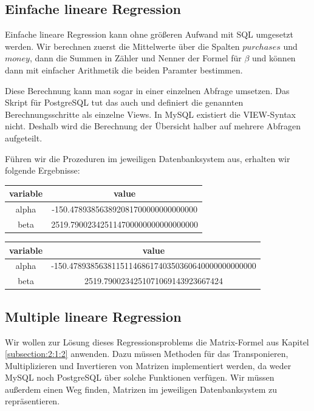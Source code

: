 \subsection{Einfache lineare Regression}
\label{subsection:3:4:1}

Einfache lineare Regression kann ohne größeren Aufwand mit SQL umgesetzt werden. Wir berechnen zuerst die Mittelwerte über die Spalten $purchases$ und $money$, dann die Summen in Zähler und Nenner der Formel für $\beta$ und können dann mit einfacher Arithmetik die beiden Paramter bestimmen.

Diese Berechnung kann man sogar in einer einzelnen Abfrage umsetzen. Das Skript für PostgreSQL tut das auch und definiert die genannten Berechnungsschritte als einzelne Views. In MySQL existiert die VIEW-Syntax nicht. Deshalb wird die Berechnung der Übersicht halber auf mehrere Abfragen aufgeteilt.

Führen wir die Prozeduren im jeweiligen Datenbanksystem aus, erhalten wir folgende Ergebnisse:

\begin{center}
  \begin{tabular}{|c|c|}\hline
    \textbf{variable} & \textbf{value} \\ \hline
    alpha & -150.478938563892081700000000000000 \\ \hline
    beta & 2519.790023425114700000000000000000 \\ \hline
  \end{tabular}

  \begin{tabular}{|c|c|}\hline
    \textbf{variable} & \textbf{value} \\ \hline
    alpha & -150.47893856381151146861740350360640000000000000 \\ \hline
    beta & 2519.7900234251071069143923667424 \\ \hline
  \end{tabular}
\end{center}

\subsection{Multiple lineare Regression}
\label{subsection:3:4:2}

Wir wollen zur Lösung dieses Regressionsproblems die Matrix-Formel aus Kapitel \ref{subsection:2:1:2} anwenden. Dazu müssen Methoden für das Transponieren, Multiplizieren und Invertieren von Matrizen implementiert werden, da weder MySQL noch PostgreSQL über solche Funktionen verfügen. Wir müssen außerdem einen Weg finden, Matrizen im jeweiligen Datenbanksystem zu repräsentieren.

